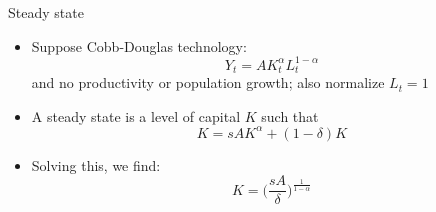 \documentclass[10pt]{beamer}
\begin{document}
\begin{frame}{Steady state}
\begin{itemize}
\item Suppose Cobb-Douglas technology:
\begin{equation*}
	Y_t = A K_t^\alpha L_t^{1-\alpha}
\end{equation*}
and no productivity or population growth; also normalize $L_t = 1$

\item A steady state is a level of capital $K$ such that 
\begin{equation*}
	K = s A K^\alpha + (1-\delta) K
\end{equation*}

\item Solving this, we find:
\begin{equation*}
	K = \bigg(\frac{sA}{\delta}\bigg)^\frac{1}{1-\alpha}
\end{equation*}
\end{itemize}

\end{frame}
\end{document}
